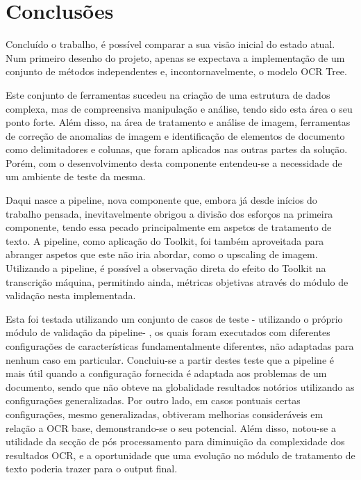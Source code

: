 \section{Conclusões}

Concluído o trabalho, é possível comparar a sua visão inicial do estado atual. Num primeiro desenho do projeto, apenas se expectava a implementação de um conjunto de métodos independentes e, incontornavelmente, o modelo OCR Tree.

Este conjunto de ferramentas sucedeu na criação de uma estrutura de dados complexa, mas de compreensiva manipulação e análise, tendo sido esta área o seu ponto forte. Além disso, na área de tratamento e análise de imagem, ferramentas de correção de anomalias de imagem e identificação de elementos de documento como delimitadores e colunas, que foram aplicados nas outras partes da solução. Porém, com o desenvolvimento desta componente entendeu-se a necessidade de um ambiente de teste da mesma. 

Daqui nasce a pipeline, nova componente que, embora já desde inícios do trabalho pensada, inevitavelmente obrigou a divisão dos esforços na primeira componente, tendo essa pecado principalmente em aspetos de tratamento de texto.
A pipeline, como aplicação do Toolkit, foi também aproveitada para abranger aspetos que este não iria abordar, como o upscaling de imagem. Utilizando a pipeline, é possível a observação direta do efeito do Toolkit na transcrição máquina, permitindo ainda, métricas objetivas através do módulo de validação nesta implementada.

Esta foi testada utilizando um conjunto de casos de teste - utilizando o próprio módulo de validação da pipeline- , os quais foram executados com diferentes configurações de características fundamentalmente diferentes, não adaptadas para nenhum caso em particular. Concluiu-se a partir destes teste que a pipeline é mais útil quando a configuração fornecida é adaptada aos problemas de um documento, sendo que não obteve na globalidade resultados notórios utilizando as configurações generalizadas. Por outro lado, em casos pontuais certas configurações, mesmo generalizadas, obtiveram melhorias consideráveis em relação a OCR base, demonstrando-se o seu potencial. Além disso, notou-se a utilidade da secção de pós processamento para diminuição da complexidade dos resultados OCR, e a oportunidade que uma evolução no módulo de tratamento de texto poderia trazer para o output final.

